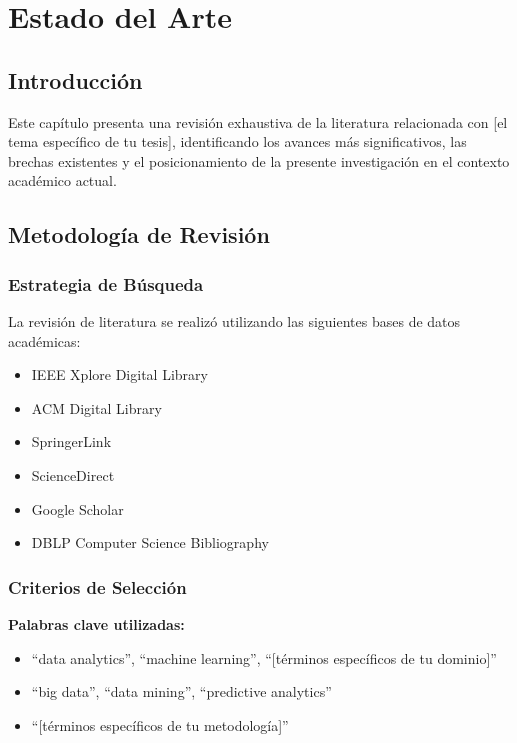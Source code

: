 
\chapter{Estado del Arte}

\section{Introducción}

Este capítulo presenta una revisión exhaustiva de la literatura relacionada con [el tema específico de tu tesis], identificando los avances más significativos, las brechas existentes y el posicionamiento de la presente investigación en el contexto académico actual.

\section{Metodología de Revisión}

\subsection{Estrategia de Búsqueda}

La revisión de literatura se realizó utilizando las siguientes bases de datos académicas:

\begin{itemize}
    \item IEEE Xplore Digital Library
    \item ACM Digital Library
    \item SpringerLink
    \item ScienceDirect
    \item Google Scholar
    \item DBLP Computer Science Bibliography
\end{itemize}

\subsection{Criterios de Selección}

\textbf{Palabras clave utilizadas:}
\begin{itemize}
    \item ``data analytics'', ``machine learning'', ``[términos específicos de tu dominio]''
    \item ``big data'', ``data mining'', ``predictive analytics''
    \item ``[términos específicos de tu metodología]''
\end{itemize}

